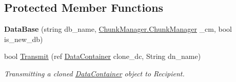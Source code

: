 \subsection*{Protected Member Functions}
\begin{DoxyCompactItemize}
\item 
\hypertarget{class_dwarf_d_b_1_1_data_structures_1_1_data_base_ab2fe1cc1e8d59bbc68ad1f996507c4ee}{
{\bfseries DataBase} (string db\_\-name, \hyperlink{class_dwarf_d_b_1_1_chunk_manager_1_1_chunk_manager}{ChunkManager.ChunkManager} \_\-cm, bool is\_\-new\_\-db)}
\label{class_dwarf_d_b_1_1_data_structures_1_1_data_base_ab2fe1cc1e8d59bbc68ad1f996507c4ee}

\item 
bool \hyperlink{class_dwarf_d_b_1_1_data_structures_1_1_data_base_a5eefaebdb94adf4d3b19f29e8f146725}{Transmit} (ref \hyperlink{class_dwarf_d_b_1_1_data_structures_1_1_data_container}{DataContainer} clone\_\-dc, String dn\_\-name)
\begin{DoxyCompactList}\small\item\em Transmitting a cloned \hyperlink{class_dwarf_d_b_1_1_data_structures_1_1_data_container}{DataContainer} object to Recipient. \item\end{DoxyCompactList}\end{DoxyCompactItemize}
